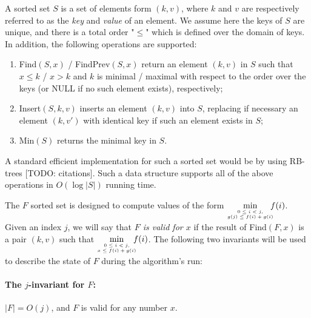 A sorted set $S$ is a set of elements form $(k, v)$, where $k$ and $v$ are respectively referred to as the \emph{key} and \emph{value} of an element. We assume here the keys of $S$ are unique, and there is a total order "$\leq$" which is defined over the domain of keys.
In addition, the following operations are supported: 
\begin{enumerate}
	\item Find$(S, x)$ / FindPrev$(S, x)$ return an element $(k, v)$ in $S$ such that $x \leq k$ / $x > k$  and $k$ is minimal / maximal with respect to the order over the keys (or NULL if no such element exists), respectively;
	\item Insert$(S, k, v)$ inserts an element $(k, v)$ into $S$, replacing if necessary an element $(k, v')$ with identical key if such an element exists in $S$;
	\item Min$(S)$ returns the minimal key in $S$.
\end{enumerate}

A standard efficient implementation for such a sorted set would be by using RB-trees [TODO: citations]. Such a data structure supports all of the above operations in $O(\log |S|)$ running time.

The $F$ sorted set is designed to compute values of the form $\hspace{-.5em}\min\limits_{{\tiny \begin{array}{c}
		0 \leq i < j, \\
		g(j) \leq f(i) + g(i)
		\end{array}}} \hspace{-1em} f(i)$.
Given an index $j$, we will say that \emph{$F$ is valid for $x$} if the result of Find$(F, x)$ is a pair $(k, v)$ such that $\hspace{-.5em}\min\limits_{{\tiny \begin{array}{c}
		0 \leq i < j, \\
		x \leq f(i) + g(i)
		\end{array}}} \hspace{-1em} f(i)$.
The following two invariants will be used to describe the state of $F$ during the algorithm's run:

\paragraph{The $j$-invariant for $F$:}
$|F| = O(j)$, and $F$ is valid for any number $x$.

